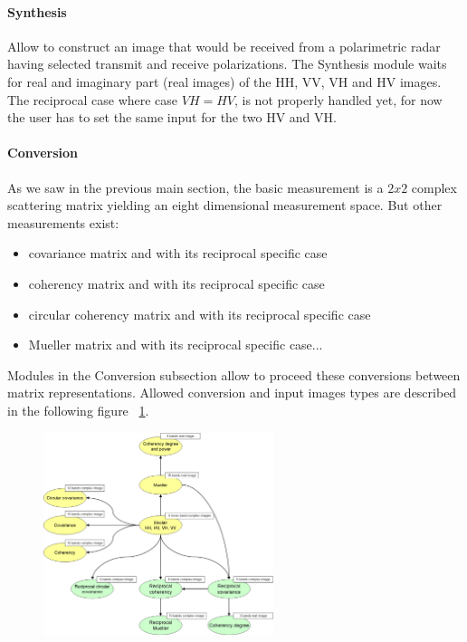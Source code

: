 \paragraph{Synthesis}

Allow to construct an image that would be received from a polarimetric radar 
having selected transmit and receive polarizations.
The Synthesis module waits for real and imaginary part (real images) of the HH, VV, VH and HV images.
The reciprocal case where case $VH=HV$, is not properly handled yet, for now the user
has to set the same input for the two HV and VH.

\paragraph{Conversion}

As we saw in the previous main section, the basic 
measurement is a $2x2$ complex scattering matrix yielding an eight dimensional 
measurement space. But other measurements exist:
\begin{itemize}
\item covariance matrix and with its reciprocal specific case
\item coherency matrix and with its reciprocal specific case
\item circular coherency matrix and with its reciprocal specific case
\item Mueller matrix and with its reciprocal specific case...
\end{itemize}

Modules in the Conversion subsection allow to proceed these conversions between matrix representations.
Allowed conversion and input images types are described in the following figure ~\ref{fig:sarpolconv}.

\begin{figure}
  \centering
  \includegraphics[width=0.6\textwidth]{../Art/MonteverdiImages/monteverdi_sarpol_conversion_schema.png}
  \label{fig:sarpolconv}
\end{figure}

